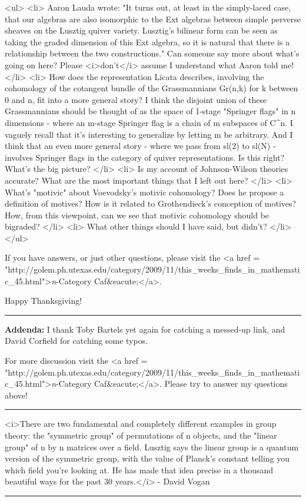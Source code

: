 <ul>
<li>
Aaron Lauda wrote: "It turns out, at least in the simply-laced case,
that our algebras are also isomorphic to the Ext algebras between
simple perverse sheaves on the Lusztig quiver variety.  Lusztig's
bilinear form can be seen as taking the graded dimension of this Ext
algebra, so it is natural that there is a relationship between the two
constructions."  Can someone say more about what's going on here?
Please <i>don't</i> assume I understand what Aaron told me!
</li>
<li>
How does the representation Licata describes, involving the cohomology
of the cotangent bundle of the Grassmannians Gr(n,k) for k between 0
and n, fit into a more general story?  I think the disjoint union of
these Grassmannians should be thought of as the space of 1-stage
"Springer flags" in n dimensions - where an m-stage Springer flag is a
chain of m subspaces of C^{n}.  I vaguely recall that it's
interesting to generalize by letting m be arbitrary.  And I think that
an even more general story - where we pass from sl(2) to sl(N) -
involves Springer flags in the category of quiver representations.  Is
this right?  What's the big picture?
</li>
<li>
Is my account of Johnson-Wilson theories accurate?  What are the most 
important things that I left out here?
</li>
<li>
What's "motivic" about Voevodsky's motivic cohomology?  Does he propose a 
definition of motives?  How is it related to Grothendieck's conception of 
motives?  How, from this viewpoint, can we see that motivic cohomology 
should be bigraded?
</li>
<li>
What other things should I have said, but didn't?
</li>
</ul>

If you have answers, or just other questions, please visit
the <a href = "http://golem.ph.utexas.edu/category/2009/11/this_weeks_finds_in_mathematic_45.html">\emph{n}-Category
Caf&eacute;</a>.  

Happy Thanksgiving!

\par\noindent\rule{\textwidth}{0.4pt}

\textbf{Addenda:} I thank Toby Bartels yet again for catching a
messed-up link, and David Corfield for catching some typos.

For more discussion visit the <a href =
"http://golem.ph.utexas.edu/category/2009/11/this_weeks_finds_in_mathematic_45.html">\emph{n}-Category
Caf&eacute;</a>.  Please try to answer my questions above!


\par\noindent\rule{\textwidth}{0.4pt}


<i>There are two fundamental and completely different examples in group
theory: the "symmetric group" of permutations of n objects, and the
"linear group" of n by n matrices over a field.  Lusztig says the
linear group is a quantum version of the symmetric group, with 
the value of Planck's constant
telling you which field you're looking at.  He has made that idea
precise in a thousand beautiful ways for the past 30 years.</i> - David Vogan
 
\par\noindent\rule{\textwidth}{0.4pt}

